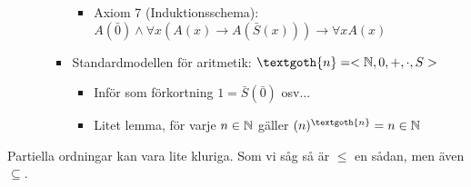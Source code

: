 \begin{itemize}
\begin{itemize}
\begin{itemize}
\begin{itemize}
              \item Axiom 7 (Induktionsschema): $A(\bar{0})\wedge\forall x(A(x)\rightarrow A(\bar{S}(x)))\rightarrow\forall x A(x)$
            \end{itemize}
          \item Standardmodellen för aritmetik: $\textgoth{n}=<\N,0,+,\cdot,S>$
            \begin{itemize}
              \item Inför som förkortning $1 = \bar{S}(\bar{0})$ osv...
              \item Litet lemma, för varje $n\in\mathbb{N}$ gäller $(n)^{\textgoth{n}}=n\in\N$
            \end{itemize}
        \end{itemize}
    \end{itemize}
\end{itemize}
\par\bigskip
\noindent Partiella ordningar kan vara lite kluriga. Som vi såg så är $\leq$ en sådan, men även $\subseteq$.
